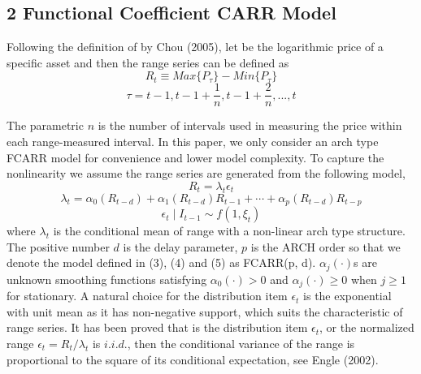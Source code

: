 \documentclass[
journal=jacsat, %
manuscript=article]{achemso}
\begin{document}
\begin{CJK*}{UTF8}{song}
\section{2  Functional Coefficient CARR Model}

Following the definition of by Chou (2005), let   be the logarithmic price of a specific asset and then the range series can be defined as
\begin{equation}
     R_t \equiv Max\{P_{\tau}\} -  Min\{P_{\tau}\}
\end{equation}
\begin{equation}
    \tau = t-1,t-1+\frac{1}{n},t-1+\frac{2}{n},...,t
\end{equation}

The parametric $n$ is the number of intervals used in measuring the price within each range-measured interval. In this paper, we only consider an arch type FCARR model for convenience and lower model complexity. To capture the nonlinearity we assume the range series are generated from the following model,
\begin{equation}
     R_t = \lambda_t \epsilon_t
\end{equation}
\begin{equation}
    \lambda_t = \alpha_0(R_{t-d}) + \alpha_1(R_{t-d})R_{t-1} + \cdots + \alpha_p(R_{t-d})R_{t-p}
\end{equation}
\begin{equation}
	 \epsilon_t \mid I_{t-1} \sim f(1, \xi_t)
\end{equation}
where $\lambda_t$ is the conditional mean of range with a non-linear arch type structure. The positive number $d$ is the delay parameter, $p$ is the ARCH order so that we denote the model defined in (3), (4) and (5) as FCARR(p, d). $\alpha_j(\cdot)$s are unknown smoothing functions satisfying $\alpha_0(\cdot) > 0$  and $\alpha_j(\cdot) \geq 0$ when $j \geq 1$ for stationary. A natural choice for the distribution item $\epsilon_t$ is the exponential with unit mean as it has non-negative support, which suits the characteristic of range series. It has been proved that is the distribution item $\epsilon_t$, or the normalized range $\epsilon_t=R_t/\lambda_t$  is $i.i.d.$, then the conditional variance of the range is proportional to the square of its conditional expectation, see Engle (2002).


\end{CJK*}
\end{document}
